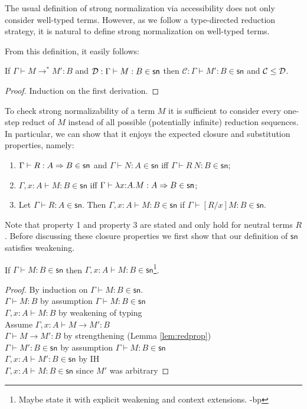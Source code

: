 \documentclass{article}
\newcommand{\C}{\mathcal{C}}
\newcommand{\csn}{\mathsf{sn}}
\newcommand{\mred}{\longrightarrow^*}
\newcommand{\red}{\longrightarrow}
\begin{document}
The usual definition of strong normalization via accessibility does not only consider well-typed terms. However, as we follow a type-directed reduction strategy, it is natural to define strong normalization on well-typed terms.

From this definition, it easily follows:

 \begin{lemma}\label{lm:mredsn}
 If $\Gamma \vdash M \mred M' : B$ and $\D : \Gamma \vdash M : B \in \csn$ then $\C : \Gamma \vdash M' : B \in \csn$ and $\C \leq \D$.
 \end{lemma}
 \begin{proof}
Induction on the first derivation.   

 \end{proof}

To check strong normalizability of a term $M$ it is sufficient to consider every one-step
reduct of $M$ instead of all possible (potentially infinite) reduction sequences. In particular, we can show that it enjoys the expected closure and substitution properties, namely:
\begin{enumerate}
\item $\Gamma \vdash R : A \arrow B \in \csn$ and $\Gamma \vdash N : A \in \csn$
    iff $\Gamma \vdash R~N : B \in \csn$;
  \item $\Gamma, x{:}A \vdash M : B \in \csn$ iff $\Gamma \vdash  \lambda x{:}A.M : A \arrow B \in \csn$;
  \item Let  $\Gamma \vdash R : A \in
   \csn$. Then $\Gamma, x{:}A \vdash M : B \in \csn$ if $\Gamma \vdash [R/x]M : B \in \csn$.
\end{enumerate}

Note that property 1 and property 3 are stated and only hold for neutral terms $R$. 
Before discussing these closure properties we first show that our definition of $\csn$ satisfies weakening.

\begin{lemma}\label{lm:wksn}
If $\Gamma \vdash M : B \in \csn$ then $\Gamma, x{:}A \vdash M : B \in \csn$\footnote{Maybe state it with explicit weakening and context extensions. -bp}.
\end{lemma}
\begin{proof}
By induction on $\Gamma \vdash M : B \in \csn$.
 \\[1em]
$\Gamma \vdash M : B$ \hfill by assumption $\Gamma \vdash M : B \in \csn$\\
$\Gamma, x{:}A \vdash M : B$ \hfill by weakening of typing\\
Assume $\Gamma, x{:}A \vdash M \red M' : B$\\
$\Gamma \vdash M \red M' : B$ \hfill by strengthening (Lemma \ref{lem:redprop}) \\
$\Gamma \vdash M' : B \in \csn$ \hfill by assumption $\Gamma \vdash M : B \in \csn$\\
$\Gamma, x{:}A \vdash M' : B \in \csn$  \hfill by IH\\
$\Gamma, x{:}A \vdash M : B \in \csn$ \hfill since $M'$ was arbitrary

\end{proof}
\end{document}
